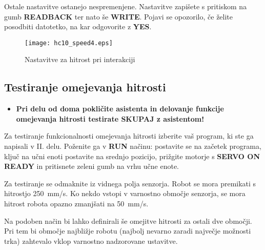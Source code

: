 Ostale nastavitve ostanejo nespremenjene. Nastavitve zapišete s pritiskom na gumb \textbf{READBACK} ter nato še \textbf{WRITE}. Pojavi se opozorilo, če želite posodbiti datotetko, na kar odgovorite z \textbf{YES}.

\begin{figure}[!hbt]
	\centering
	\texttt{[image: hc10\_speed4.eps]}
	\caption{Nastavitve za hitrost pri interakciji}
	\label{fig:hc10_speed4}
\end{figure}

\subsection{Testiranje omejevanja hitrosti} \label{test3del}

\begin{mdframed}[backgroundcolor=red!20, shadow=true,roundcorner=8pt]
	\begin{itemize}
		\item \textbf{Pri delu od doma pokličite asistenta in delovanje funkcije omejevanja hitrosti testirate SKUPAJ z asistentom!}		
	\end{itemize}
\end{mdframed}

Za testiranje funkcionalnosti omejevanja hitrosti izberite vaš program, ki ste ga napisali v II. delu. Poženite ga v \textbf{RUN} načinu: postavite se na začetek programa, ključ na učni enoti postavite na srednjo pozicijo, prižgite motorje s \textbf{SERVO ON READY} in pritisnete zeleni gumb na vrhu učne enote.

Za testiranje se odmaknite iz vidnega polja senzorja. Robot se mora premikati s hitrostjo 250~mm/s. Ko nekdo vstopi v varnostno območje senzorja, se mora hitrost robota opazno zmanjšati na 50~mm/s.

Na podoben način bi lahko definirali še omejitve hitrosti za ostali dve območji. Pri tem bi območje najbližje robotu (najbolj nevarno zaradi največje možnosti trka) zahtevalo vklop varnostno nadzorovane ustavitve.



